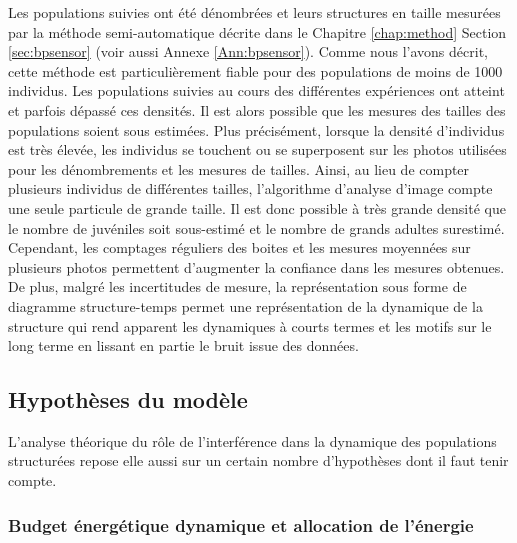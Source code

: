 Les populations suivies ont été dénombrées et leurs structures en taille
mesurées par la méthode semi-automatique décrite dans le Chapitre \ref{chap:method}
Section \ref{sec:bpsensor} (voir aussi Annexe \ref{Ann:bpsensor}).
Comme nous l'avons décrit, cette méthode est particulièrement fiable pour des
populations de moins de 1000 individus. Les populations suivies au cours des
différentes expériences ont atteint et parfois dépassé ces densités.
Il est alors possible que les mesures des tailles des populations soient
sous estimées. Plus précisément, lorsque la densité d'individus est très
élevée, les individus se touchent ou se superposent sur les photos utilisées
pour les dénombrements et les mesures de tailles. Ainsi, au lieu de compter
plusieurs individus de différentes tailles, l'algorithme d'analyse d'image
compte une seule particule de grande taille. Il est donc possible à très grande
densité que le nombre de juvéniles soit sous-estimé et le nombre de grands
adultes surestimé. Cependant, les comptages réguliers des boites et les mesures
moyennées sur plusieurs photos permettent d'augmenter la confiance dans les
mesures obtenues. De plus, malgré les incertitudes de mesure, la représentation
sous forme de diagramme structure-temps permet une représentation de la
dynamique de la structure qui rend apparent les dynamiques à courts termes et
les motifs sur le long terme en lissant en partie le bruit issue des données.

\subsection{Hypothèses du modèle}

L'analyse théorique du rôle de l'interférence dans la dynamique des populations
structurées repose elle aussi sur un certain nombre d'hypothèses dont il faut
tenir compte.

\subsubsection{Budget énergétique dynamique et allocation de l'énergie}

